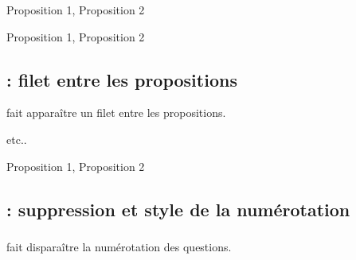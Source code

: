 \bigskip
\begin{minipage}[c][][t]{.45\linewidth}
\begin{tkzexample}
  \begin{alterqcm}[lq=6cm,pre=true,%
                   bonus=1,malus={0,5}]
  {{Proposition 1},
   {Proposition 2}}
  \end{alterqcm}\end{tkzexample}
\end{minipage}\hfill
\begin{minipage}[c][][t]{.45\linewidth}
  \begin{alterqcm}[lq=3cm,pre=true,
                   bonus=1,malus={0,5}]
  {{Proposition 1},
   {Proposition 2}}
  \end{alterqcm}
\end{minipage}

\vspace{1cm} 

\subsection{ : filet entre les propositions}

 fait apparaître un filet entre les propositions.

\begin{minipage}[c][][t]{.45\linewidth}
\begin{tkzexample}
  \begin{alterqcm}[lq=3cm,sep=true]
    etc..
\end{alterqcm}\end{tkzexample}
\end{minipage}\hfill
\begin{minipage}[c][][t]{.45\linewidth}
  \begin{alterqcm}[lq=3cm,sep=true]
  {{Proposition 1},
   {Proposition 2}}
  \end{alterqcm}
\end{minipage}

\subsection{ : suppression et style de la numérotation }
\subsubsection{}
 fait disparaître la numérotation des questions.

